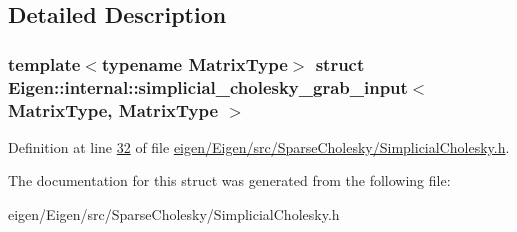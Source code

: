 \subsection{Detailed Description}
\subsubsection*{template$<$typename Matrix\+Type$>$\newline
struct Eigen\+::internal\+::simplicial\+\_\+cholesky\+\_\+grab\+\_\+input$<$ Matrix\+Type, Matrix\+Type $>$}



Definition at line \hyperlink{eigen_2_eigen_2src_2_sparse_cholesky_2_simplicial_cholesky_8h_source_l00032}{32} of file \hyperlink{eigen_2_eigen_2src_2_sparse_cholesky_2_simplicial_cholesky_8h_source}{eigen/\+Eigen/src/\+Sparse\+Cholesky/\+Simplicial\+Cholesky.\+h}.



The documentation for this struct was generated from the following file\+:\begin{DoxyCompactItemize}
\item 
eigen/\+Eigen/src/\+Sparse\+Cholesky/\+Simplicial\+Cholesky.\+h\end{DoxyCompactItemize}
